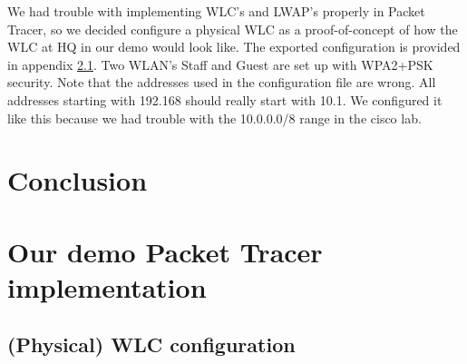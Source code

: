 We had trouble with implementing WLC's and LWAP's properly in Packet Tracer, so we decided configure a physical WLC as a proof-of-concept of how the WLC at HQ in our demo would look like. The exported configuration is provided in appendix \ref{configwlc}. Two WLAN's Staff and Guest are set up with WPA2+PSK security. Note that the addresses used in the configuration file are wrong. All addresses starting with 192.168 should really start with 10.1. We configured it like this because we had trouble with the 10.0.0.0/8 range in the cisco lab.

\section{Conclusion}



\clearpage %

\nocite{*}





\clearpage %
\appendix

\section{Our demo Packet Tracer implementation} \label{config}


\subsection{(Physical) WLC configuration} \label{configwlc}

\inputminted[fontsize=\tiny,linenos,breaklines]{text}{./wirelessimplementation/wlc.cisco}



